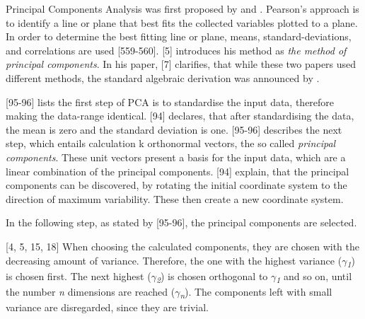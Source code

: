 
Principal Components Analysis was first proposed by \textcite{OnLinesAndPlanes1901} and \textcite{hotelling1933analysis}.
Pearson's approach is to identify a line or plane that best fits the collected variables plotted to a plane. In order to determine the best fitting line or plane, means, standard-deviations, and correlations are used \autocite{OnLinesAndPlanes1901}[559-560].
\textcite{hotelling1933analysis}[5] introduces his method as \textit{the method of principal components}. In his paper, \textcite{jolliffe2002PCA}[7] clarifies, that while these two papers used different methods, the standard algebraic
derivation was announced by \textcite{hotelling1933analysis}.



\textcite{han2011data}[95-96] lists the first step of PCA is to standardise the input data, therefore making the data-range identical. \textcite{DataMiningAndPredictiveAnalytics}[94] declares, that after standardising the data, the mean is zero and the standard deviation is one.
\textcite{han2011data}[95-96] describes the next step, which entails calculation k orthonormal vectors, the so called \textit{principal components}. These unit vectors present a basis for the input data, which are a linear combination of the principal components. \textcite{DataMiningAndPredictiveAnalytics}[94] explain, that the principal components can be discovered, by rotating the initial coordinate system to the direction of maximum variability. These then create a new coordinate system.

In the following step, as stated by \textcite{han2011data}[95-96], the principal components are selected. 


\textcite{hotelling1933analysis}[4, 5, 15, 18] When choosing the calculated components, they are chosen with the decreasing amount of variance. Therefore, the one with the highest variance (\textit{$\gamma$\textsubscript{1}}) is chosen first. The next highest (\textit{$\gamma$\textsubscript{2}}) is chosen orthogonal to \textit{$\gamma$\textsubscript{1}} and so on, until the number \textit{n} dimensions are reached (\textit{$\gamma$\textsubscript{n}}). The components left with small variance are disregarded, since they are trivial. 




